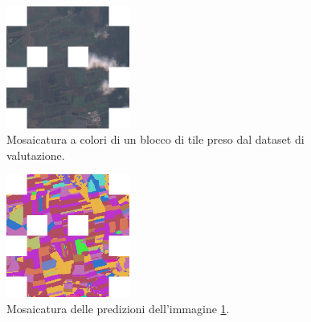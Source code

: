 \begin{multicols}{2}
{
    \begin{figure}[H]
        \centering
        \includegraphics[width=0.36\textwidth]{Immagini/sperimentazione/ESEMPIO_MOSICATURA_2_INPUT_1.png}
        \caption{Mosaicatura a colori di un blocco di tile preso dal dataset di valutazione.}
        \label{fig:MOSAIC_RGB_4}
    \end{figure}
}
{
    \begin{figure}[H]
        \centering
        \includegraphics[width=0.36\textwidth]{Immagini/sperimentazione/ESEMPIO_MOSICATURA_2_PRED_1.png}
        \caption{Mosaicatura delle predizioni dell'immagine \ref{fig:MOSAIC_RGB_4}.}
    \end{figure}
}
\end{multicols}

